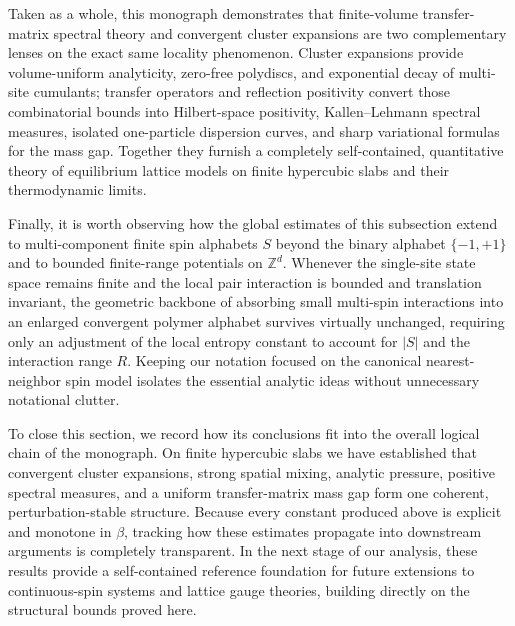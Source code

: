 \documentclass[11pt]{article}
\theoremstyle{definition}
\begin{document}
Taken as a whole, this monograph demonstrates that finite-volume transfer-matrix
spectral theory and convergent cluster expansions are two complementary lenses on
the exact same locality phenomenon. Cluster expansions provide volume-uniform
analyticity, zero-free polydiscs, and exponential decay of multi-site cumulants;
transfer operators and reflection positivity convert those combinatorial bounds into
Hilbert-space positivity, Kallen--Lehmann spectral measures, isolated one-particle
dispersion curves, and sharp variational formulas for the mass gap. Together they
furnish a completely self-contained, quantitative theory of equilibrium lattice
models on finite hypercubic slabs and their thermodynamic limits.

Finally, it is worth observing how the global estimates of this subsection extend to
multi-component finite spin alphabets $S$ beyond the binary alphabet $\{-1, +1\}$
and to bounded finite-range potentials on $\mathbb{Z}^d$. Whenever the single-site
state space remains finite and the local pair interaction is bounded and translation
invariant, the geometric backbone of absorbing small multi-spin interactions into an
enlarged convergent polymer alphabet survives virtually unchanged, requiring only an
adjustment of the local entropy constant to account for $|S|$ and the interaction
range $R$. Keeping our notation focused on the canonical nearest-neighbor spin model
isolates the essential analytic ideas without unnecessary notational clutter.

To close this section, we record how its conclusions fit into the overall logical
chain of the monograph. On finite hypercubic slabs we have established that
convergent cluster expansions, strong spatial mixing, analytic pressure, positive
spectral measures, and a uniform transfer-matrix mass gap form one coherent,
perturbation-stable structure. Because every constant produced above is explicit and
monotone in $\beta$, tracking how these estimates propagate into downstream
arguments is completely transparent. In the next stage of our analysis, these
results provide a self-contained reference foundation for future extensions to
continuous-spin systems and lattice gauge theories, building directly on the
structural bounds proved here.
\end{document}
